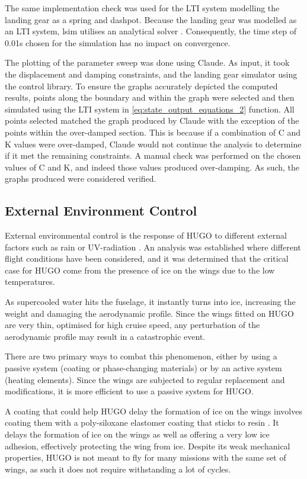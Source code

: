 The same implementation check was used for the LTI system modelling the landing gear as a spring and dashpot. Because the landing gear was modelled as an LTI system, lsim utilises an analytical solver \cite{python_control_2026}. Consequently, the time step of 0.01s chosen for the simulation has no impact on convergence. 

The plotting of the parameter sweep was done using Claude. As input, it took the displacement and damping constraints, and the landing gear simulator using the control library. To ensure the graphs accurately depicted the computed results, points along the boundary and within the graph were selected and then simulated using the LTI system in \autoref{eq:state_output_equations_2} function. All points selected matched the graph produced by Claude with the exception of the points within the over-damped section. This is because if a combination of C and K values were over-damped, Claude would not continue the analysis to determine if it met the remaining constraints. A manual check was performed on the chosen values of C and K, and indeed those values produced over-damping. As such, the graphs produced were considered verified.


\subsection{External Environment Control}
\label{sub:environmental_control}
External environmental control is the response of HUGO to different external factors such as rain or UV-radiation \cite{andreev2014icing}. An analysis was established where different flight conditions have been considered, and it was determined that the critical case for HUGO come from the presence of ice on the wings due to the low temperatures. 

As supercooled water hits the fuselage, it instantly turns into ice, increasing the weight \cite{andreev2014icing} and damaging the aerodynamic profile. Since the wings fitted on HUGO are very thin, optimised for high cruise speed, any perturbation of the aerodynamic profile may result in a catastrophic event. 

There are two primary ways to combat this phenomenon, either by using a passive system (coating or phase-changing materials) or by an active system (heating elements). Since the wings are subjected to regular replacement and modifications, it is more efficient to use a passive system for HUGO. 

A coating that could help HUGO delay the formation of ice on the wings involves coating them with a poly-siloxane elastomer coating that sticks to resin \cite{facco2025passive}. It delays the formation of ice on the wings as well as offering a very low ice adhesion, effectively protecting the wing from ice. Despite its weak mechanical properties, HUGO is not meant to fly for many missions with the same set of wings, as such it does not require withstanding a lot of cycles. 

